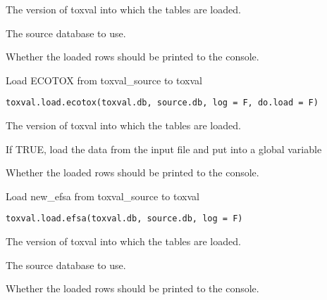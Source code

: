 \documentclass[letterpaper]{book}
\begin{document}
%
\begin{Arguments}
\begin{ldescription}
\item[\code{toxval.db}] The version of toxval into which the tables are loaded.

\item[\code{source.db}] The source database to use.

\item[\code{verbose}] Whether the loaded rows should be printed to the console.
\end{ldescription}
\end{Arguments}
%
\begin{Description}\relax
Load ECOTOX from toxval\_source to toxval
\end{Description}
%
\begin{Usage}
\begin{verbatim}
toxval.load.ecotox(toxval.db, source.db, log = F, do.load = F)
\end{verbatim}
\end{Usage}
%
\begin{Arguments}
\begin{ldescription}
\item[\code{toxval.db}] The version of toxval into which the tables are loaded.

\item[\code{do.load}] If TRUE, load the data from the input file and put into a global variable

\item[\code{verbose}] Whether the loaded rows should be printed to the console.
\end{ldescription}
\end{Arguments}
%
\begin{Description}\relax
Load new\_efsa from toxval\_source to toxval
\end{Description}
%
\begin{Usage}
\begin{verbatim}
toxval.load.efsa(toxval.db, source.db, log = F)
\end{verbatim}
\end{Usage}
%
\begin{Arguments}
\begin{ldescription}
\item[\code{toxval.db}] The version of toxval into which the tables are loaded.

\item[\code{source.db}] The source database to use.

\item[\code{verbose}] Whether the loaded rows should be printed to the console.
\end{ldescription}
\end{Arguments}
\end{document}
